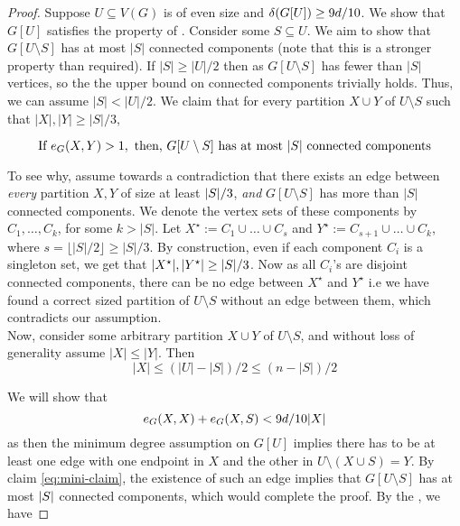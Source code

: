 \documentclass[11pt]{article}
\begin{document}
\begin{proof}
  Suppose $U \subseteq V(G)$ is of even size and $\delta(G[U]) \ge \cTilde$.
  We show that $G[U]$ satisfies the property of .
  Consider some $S \subseteq U$.
  We aim to show that $G[U \setminus S]$ has at most $|S|$ connected components (note that this is a stronger property than required).
  If $|S| \ge |U|/2$ then as $G[U \setminus S]$ has fewer than $|S|$ vertices, so the the upper bound on connected components trivially holds. 
Thus, we can assume $|S| < |U|/2$.
 We claim that for every partition $X \cup Y$ of $U \setminus S$ such that $|X|, |Y| \ge |S|/3$,

 \begin{equation}
  \text{If }\CutEdges{X}{Y}{G} > 1, \text{ then, }  G[U \setminus S] \text{ has at most $|S|$ connected components}  \label{eq:mini-claim}
 \end{equation}

\flushleft
To see why, assume towards a contradiction that there exists an edge between \emph{every} partition $X, Y$ of size at least $\Size{S}/3$, \emph{and} $G[U \setminus S]$ has more than $|S|$ connected components.
We denote the  vertex sets of these components by $C_1, \ldots, C_k$, for some $k > |S|$.
Let $X^\star := C_1 \cup \ldots \cup C_{s}$ and $Y^\star := C_{s+1} \cup \ldots \cup C_{k}$, where $s = \lfloor |S|/2 \rfloor \ge |S|/3$.
By construction, even if each component $C_i$ is a singleton set, we get that  $\Size{X^\star}, \Size{Y^\star} \ge \Size{S}/3$.
Now as all $C_i$'s are disjoint connected components, there can be no edge between $X^\star$ and $Y^\star$ i.e we have found a correct sized partition of $U \setminus S$ without an edge between them, which contradicts our assumption. \\
\flushleft
Now, consider some arbitrary partition $X \cup Y$ of $U \setminus S$, and without loss of generality assume $|X| \le |Y|$. Then
\begin{equation}
|X| \le (|U| - |S|)/2 \le (n - |S|)/2  \label{eq:upp-X}
\end{equation}

  We will show that
    \begin{equation} \label{eq:edge_bound}
        \CutEdges{X}{X}{G} + \CutEdges{X}{S}{G} < \cTilde|X|
    \end{equation}
    as then the minimum degree assumption on $G[U]$ implies there has to be at least one edge with one endpoint in $X$ and the other in $U \setminus (X \cup S) = Y$. By claim \eqref{eq:mini-claim}, the existence of such an edge implies that $G[U\setminus S]$ has at most $\Size{S}$ connected components, which would complete the proof.
    By the , we have


\end{proof}
\end{document}
